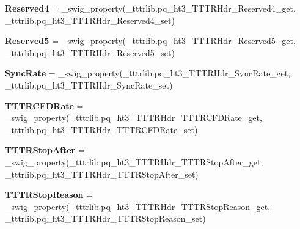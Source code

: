 \begin{DoxyCompactItemize}
{\bfseries Reserved4} = \+\_\+swig\+\_\+property(\+\_\+tttrlib.\+pq\+\_\+ht3\+\_\+\+T\+T\+T\+R\+Hdr\+\_\+\+Reserved4\+\_\+get, \+\_\+tttrlib.\+pq\+\_\+ht3\+\_\+\+T\+T\+T\+R\+Hdr\+\_\+\+Reserved4\+\_\+set)
\item 
\mbox{\label{classtttrlib_1_1pq__ht3___t_t_t_r_hdr_a1f449627548e00da124244b491b0f532}} 
{\bfseries Reserved5} = \+\_\+swig\+\_\+property(\+\_\+tttrlib.\+pq\+\_\+ht3\+\_\+\+T\+T\+T\+R\+Hdr\+\_\+\+Reserved5\+\_\+get, \+\_\+tttrlib.\+pq\+\_\+ht3\+\_\+\+T\+T\+T\+R\+Hdr\+\_\+\+Reserved5\+\_\+set)
\item 
\mbox{\label{classtttrlib_1_1pq__ht3___t_t_t_r_hdr_a409fc7862821529857381a02ccfc1991}} 
{\bfseries Sync\+Rate} = \+\_\+swig\+\_\+property(\+\_\+tttrlib.\+pq\+\_\+ht3\+\_\+\+T\+T\+T\+R\+Hdr\+\_\+\+Sync\+Rate\+\_\+get, \+\_\+tttrlib.\+pq\+\_\+ht3\+\_\+\+T\+T\+T\+R\+Hdr\+\_\+\+Sync\+Rate\+\_\+set)
\item 
\mbox{\label{classtttrlib_1_1pq__ht3___t_t_t_r_hdr_a3ad5b0474626bae4c689a259cc297389}} 
{\bfseries T\+T\+T\+R\+C\+F\+D\+Rate} = \+\_\+swig\+\_\+property(\+\_\+tttrlib.\+pq\+\_\+ht3\+\_\+\+T\+T\+T\+R\+Hdr\+\_\+\+T\+T\+T\+R\+C\+F\+D\+Rate\+\_\+get, \+\_\+tttrlib.\+pq\+\_\+ht3\+\_\+\+T\+T\+T\+R\+Hdr\+\_\+\+T\+T\+T\+R\+C\+F\+D\+Rate\+\_\+set)
\item 
\mbox{\label{classtttrlib_1_1pq__ht3___t_t_t_r_hdr_aed01462ccfd311f8897e36a45db6ec15}} 
{\bfseries T\+T\+T\+R\+Stop\+After} = \+\_\+swig\+\_\+property(\+\_\+tttrlib.\+pq\+\_\+ht3\+\_\+\+T\+T\+T\+R\+Hdr\+\_\+\+T\+T\+T\+R\+Stop\+After\+\_\+get, \+\_\+tttrlib.\+pq\+\_\+ht3\+\_\+\+T\+T\+T\+R\+Hdr\+\_\+\+T\+T\+T\+R\+Stop\+After\+\_\+set)
\item 
\mbox{\label{classtttrlib_1_1pq__ht3___t_t_t_r_hdr_a9cb7dc8344880c61c9dcd1e552d627e4}} 
{\bfseries T\+T\+T\+R\+Stop\+Reason} = \+\_\+swig\+\_\+property(\+\_\+tttrlib.\+pq\+\_\+ht3\+\_\+\+T\+T\+T\+R\+Hdr\+\_\+\+T\+T\+T\+R\+Stop\+Reason\+\_\+get, \+\_\+tttrlib.\+pq\+\_\+ht3\+\_\+\+T\+T\+T\+R\+Hdr\+\_\+\+T\+T\+T\+R\+Stop\+Reason\+\_\+set)
\item 
\mbox{\label{classtttrlib_1_1pq__ht3___t_t_t_r_hdr_a5a68135d81b43e6d6f7df8ba69023423}} 

\end{DoxyCompactItemize}
